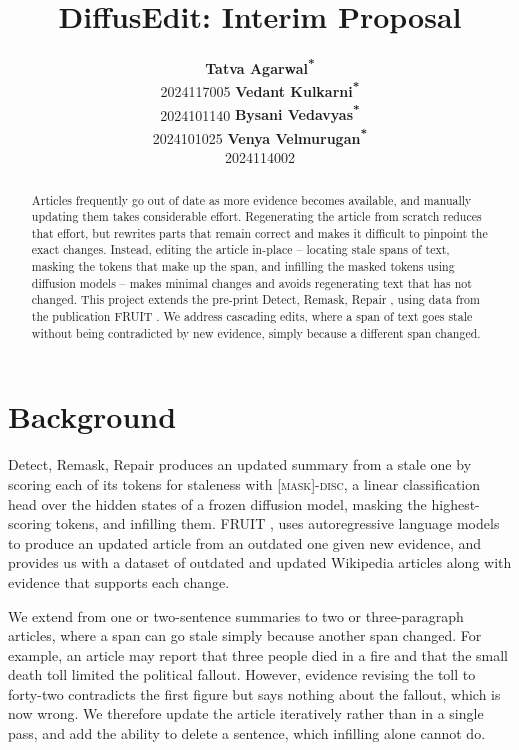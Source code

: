 \documentclass[11pt]{article}
\title{DiffusEdit: Interim Proposal}
\author{
  \textbf{Tatva Agarwal\textsuperscript{*}} \\ 2024117005 \And
  \textbf{Vedant Kulkarni\textsuperscript{*}} \\ 2024101140 \And
  \textbf{Bysani Vedavyas\textsuperscript{*}} \\ 2024101025 \And
  \textbf{Venya Velmurugan\textsuperscript{*}} \\ 2024114002
}
\begin{document}
\maketitle

\renewcommand{\thefootnote}{\fnsymbol{footnote}}
\renewcommand{\thefootnote}{\arabic{footnote}}
\setcounter{footnote}{0}

\begin{abstract}
Articles frequently go out of date as more evidence becomes available, and manually updating them takes considerable effort. Regenerating the article from scratch reduces that effort, but rewrites parts that remain correct and makes it difficult to pinpoint the exact changes. Instead, editing the article in-place -- locating stale spans of text, masking the tokens that make up the span, and infilling the masked tokens using diffusion models -- makes minimal changes and avoids regenerating text that has not changed. This project extends the pre-print Detect, Remask, Repair \citep{zou-etal-2026-detect}, using data from the publication FRUIT \citep{iv-etal-2022-fruit}. We address cascading edits, where a span of text goes stale without being contradicted by new evidence, simply because a different span changed.
\end{abstract}

\section{Background}

Detect, Remask, Repair \citep{zou-etal-2026-detect} produces an updated summary from a stale one by scoring each of its tokens for staleness with \textsc{[mask]-disc}, a linear classification head over the hidden states of a frozen diffusion model, masking the highest-scoring tokens, and infilling them. FRUIT \citep{iv-etal-2022-fruit}, uses autoregressive language models to produce an updated article from an outdated one given new evidence, and provides us with a dataset of outdated and updated Wikipedia articles along with evidence that supports each change.

We extend \citet{zou-etal-2026-detect} from one or two-sentence summaries to two or three-paragraph articles, where a span can go stale simply because another span changed. For example, an article may report that three people died in a fire and that the small death toll limited the political fallout. However, evidence revising the toll to forty-two contradicts the first figure but says nothing about the fallout, which is now wrong. We therefore update the article iteratively rather than in a single pass, and add the ability to delete a sentence, which infilling alone cannot do.
\end{document}

